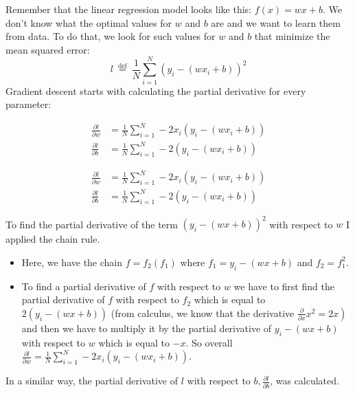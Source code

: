 \documentclass[9pt,dvipsnames]{beamer}
\begin{document}
\begin{frame}
	Remember that the linear regression model looks like this: $f(x)=w x+b$. We don't know what the optimal values for $w$ and $b$ are and we want to learn them from data. To do that, we look for such values for $w$ and $b$ that minimize the mean squared error:
	$$
	l \stackrel{\text { def }}{=} \frac{1}{N} \sum_{i=1}^{N}\left(y_{i}-\left(w x_{i}+b\right)\right)^{2}
	$$
	Gradient descent starts with calculating the partial derivative for every parameter:
	
	$$
	\begin{aligned}
		\frac{\partial l}{\partial w} & =\frac{1}{N} \sum_{i=1}^{N}-2 x_{i}\left(y_{i}-\left(w x_{i}+b\right)\right) \\
		\frac{\partial l}{\partial b} & =\frac{1}{N} \sum_{i=1}^{N}-2\left(y_{i}-\left(w x_{i}+b\right)\right)
	\end{aligned}
	$$
\end{frame}

\begin{frame}
	$$
	\begin{aligned}
		\frac{\partial l}{\partial w} & =\frac{1}{N} \sum_{i=1}^{N}-2 x_{i}\left(y_{i}-\left(w x_{i}+b\right)\right) \\
		\frac{\partial l}{\partial b} & =\frac{1}{N} \sum_{i=1}^{N}-2\left(y_{i}-\left(w x_{i}+b\right)\right)
	\end{aligned}
	$$
	
	To find the partial derivative of the term $\left(y_{i}-(w x+b)\right)^{2}$ with respect to $w$ I applied the chain rule.
	\begin{itemize}
		\item Here, we have the chain $f=f_{2}\left(f_{1}\right)$ where $f_{1}=y_{i}-(w x+b)$ and $f_{2}=f_{1}^{2}$. 
		\item To find a partial derivative of $f$ with respect to $w$ we have to first find the partial derivative of $f$ with respect to $f_{2}$ which is equal to $2\left(y_{i}-(w x+b)\right)$ (from calculus, we know that the derivative $\left.\frac{\partial}{\partial x} x^{2}=2 x\right)$ and then we have to multiply it by the partial derivative of $y_{i}-(w x+b)$ with respect to $w$ which is equal to $-x$. So overall $\frac{\partial l}{\partial w}=\frac{1}{N} \sum_{i=1}^{N}-2 x_{i}\left(y_{i}-\left(w x_{i}+b\right)\right)$. 
	\end{itemize}
	 In a similar way, the partial derivative of $l$ with respect to $b, \frac{\partial l}{\partial b}$, was calculated.
\end{frame}
\end{document}
